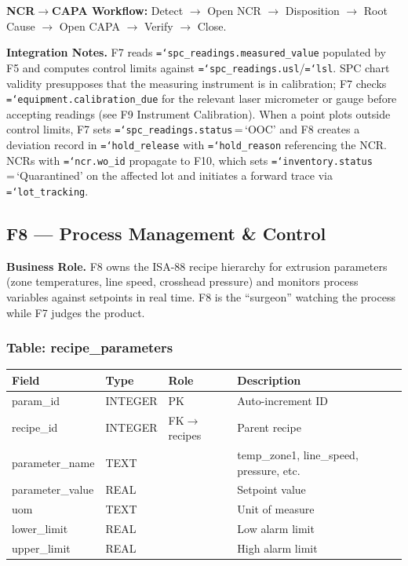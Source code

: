 \documentclass[11pt]{article}
\newcommand{\tfield}[1]{\texttt{\hyphenchar\font=`\-\relax #1}}
\begin{document}
\textbf{NCR$\to$CAPA Workflow:} Detect $\to$ Open NCR $\to$ Disposition $\to$ Root Cause $\to$ Open CAPA $\to$ Verify $\to$ Close.

\textbf{Integration Notes.}
F7 reads \tfield{spc\_readings.measured\_value} populated by F5 and computes control limits against \tfield{spc\_readings.usl}/\tfield{lsl}.  SPC chart validity presupposes that the measuring instrument is in calibration; F7 checks \tfield{equipment.\allowbreak calibration\_due} for the relevant laser micrometer or gauge before accepting readings (see F9 Instrument Calibration).  When a point plots outside control limits, F7 sets \tfield{spc\_readings.status}\,=\,`OOC' and F8 creates a deviation record in \tfield{hold\_release} with \tfield{hold\_reason} referencing the NCR.  NCRs with \tfield{ncr.wo\_id} propagate to F10, which sets \tfield{inventory.status}\,=\,`Quarantined' on the affected lot and initiates a forward trace via \tfield{lot\_tracking}.

\subsection{F8 --- Process Management \& Control}

\textbf{Business Role.}
F8 owns the ISA-88 recipe hierarchy for extrusion parameters (zone temperatures, line speed, crosshead pressure) and monitors process variables against setpoints in real time.  F8 is the ``surgeon'' watching the process while F7 judges the product.

\subsubsection*{Table: recipe\_parameters}
\begin{table}[H]\centering\small
\begin{tabular}{@{} l l l L{5.0cm} @{}}
\toprule
\textbf{Field} & \textbf{Type} & \textbf{Role} & \textbf{Description} \\
\midrule
param\_id        & INTEGER & PK  & Auto-increment ID \\
recipe\_id       & INTEGER & FK$\to$recipes & Parent recipe \\
parameter\_name  & TEXT    &     & temp\_zone1, line\_speed, pressure, etc. \\
parameter\_value & REAL    &     & Setpoint value \\
uom             & TEXT    &     & Unit of measure \\
lower\_limit    & REAL    &     & Low alarm limit \\
upper\_limit    & REAL    &     & High alarm limit \\
\bottomrule
\end{tabular}
\end{table}
\end{document}
